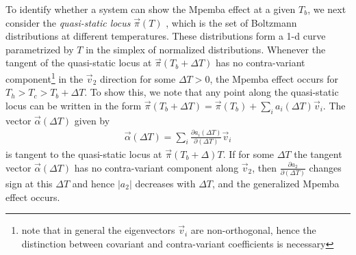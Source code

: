 \documentclass[a4paper,draft,aps,prl,preprint,superscriptaddress,nofootinbib]{revtex4}
\begin{document}
		To identify whether a system can show the Mpemba effect at a given $T_b$, we next consider the \emph{quasi-static locus} $\vec \pi(T)$ \cite{callen2006thermodynamics}, which is the set of Boltzmann distributions at different temperatures. These distributions form a 1-d curve parametrized by $T$ in the simplex of normalized distributions.  Whenever the tangent of the quasi-static locus at $\vec \pi(T_b+\Delta T)$ has no contra-variant component\footnote{note that in general the eigenvectors $\vec v_i$ are non-orthogonal, hence the distinction between covariant and contra-variant coefficients is necessary} in the $\vec v_2$ direction  for some $\Delta T>0$, the Mpemba effect occurs for  $T_h>T_c>T_b+\Delta T$.  To show this, we note that any point along the quasi-static locus can be written in the form $\vec{\pi}(T_b+\Delta T) = \vec\pi(T_b) + \sum_i a_i(\Delta T) \vec v_i$. The vector $\vec \alpha(\Delta T)$ given by 
		\begin{eqnarray}
				\vec \alpha (\Delta T) = \sum_i \frac{\partial a_i(\Delta T)}{\partial(\Delta T)} \vec v_i 
		\end{eqnarray} 
		is tangent to the quasi-static locus at $\vec\pi(T_b+\Delta) T$. If for some $\Delta T$ the tangent vector $\vec{\alpha}(\Delta T)$ has no contra-variant component along $\vec v_2$, then $\frac{\partial a_2}{\partial(\Delta T)}$ changes sign at this $\Delta T$ and hence $|a_2|$ decreases with $\Delta T$, and the generalized Mpemba effect occurs. 
		
\end{document}
